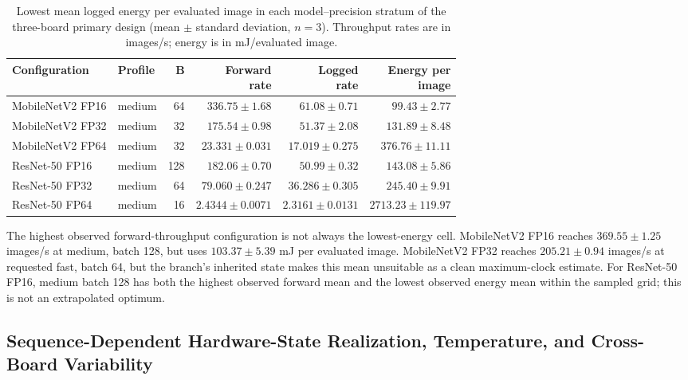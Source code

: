 \documentclass[electronics,article,submit,pdftex,moreauthors]{Definitions/mdpi}
\newcommand{\mobile}{MobileNetV2}
\newcommand{\resnet}{ResNet-50}
\begin{document}
\begin{table}[t]
\caption{Lowest mean logged energy per evaluated image in each model--precision stratum of the three-board primary design (mean $\pm$ standard deviation, $n=3$). Throughput rates are in images/s; energy is in mJ/evaluated image.}
\label{tab:best-primary}
\centering
\small
\begin{tabular}{llrrrr}
\toprule
Configuration & Profile & B & \shortstack{Forward\\rate} & \shortstack{Logged\\rate} & \shortstack{Energy per\\image} \\
\midrule
\mobile{} FP16 & medium & 64 & $336.75\pm1.68$ & $61.08\pm0.71$ & $99.43\pm2.77$ \\
\mobile{} FP32 & medium & 32 & $175.54\pm0.98$ & $51.37\pm2.08$ & $131.89\pm8.48$ \\
\mobile{} FP64 & medium & 32 & $23.331\pm0.031$ & $17.019\pm0.275$ & $376.76\pm11.11$ \\
\resnet{} FP16 & medium & 128 & $182.06\pm0.70$ & $50.99\pm0.32$ & $143.08\pm5.86$ \\
\resnet{} FP32 & medium & 64 & $79.060\pm0.247$ & $36.286\pm0.305$ & $245.40\pm9.91$ \\
\resnet{} FP64 & medium & 16 & $2.4344\pm0.0071$ & $2.3161\pm0.0131$ & $2713.23\pm119.97$ \\
\bottomrule
\end{tabular}
\end{table}

The highest observed forward-throughput configuration is not always the lowest-energy cell. \mobile{} FP16 reaches $369.55\pm1.25$ images/s at medium, batch 128, but uses $103.37\pm5.39$ mJ per evaluated image. \mobile{} FP32 reaches $205.21\pm0.94$ images/s at requested fast, batch 64, but the branch's inherited state makes this mean unsuitable as a clean maximum-clock estimate. For \resnet{} FP16, medium batch 128 has both the highest observed forward mean and the lowest observed energy mean within the sampled grid; this is not an extrapolated optimum.

\subsection{Sequence-Dependent Hardware-State Realization, Temperature, and Cross-Board Variability}
\end{document}
